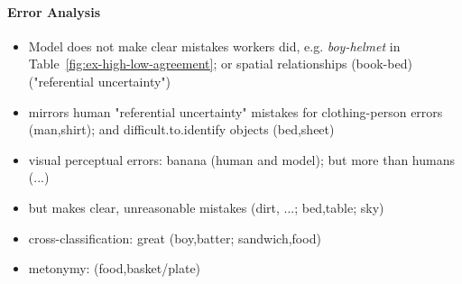 \paragraph{Error Analysis}
\begin{itemize}
	\item Model does not make clear mistakes workers did, e.g. \textsl{boy-helmet} in Table\ \ref{fig:ex-high-low-agreement}; or spatial relationships (book-bed) ("referential uncertainty")
	\item mirrors human "referential uncertainty" mistakes for clothing-person errors (man,shirt); and difficult.to.identify objects (bed,sheet)
	\item visual perceptual errors: banana (human and model); but more than humans (...)
	\item but makes clear, unreasonable mistakes (dirt, ...; bed,table; sky)
	\item cross-classification: great (boy,batter; sandwich,food)
	\item metonymy: (food,basket/plate)
\end{itemize}
\fi
